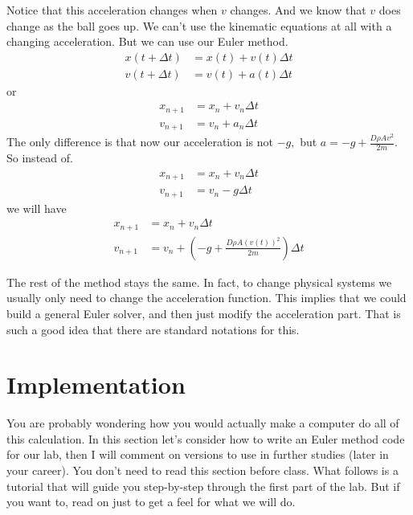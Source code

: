 \documentclass[twoside,11pt,ShortChapTitles]{BYUTextbook}
\begin{document}
Notice that this acceleration changes when $v$ changes. And we know that $v$
does change as the ball goes up. We can't use the kinematic equations at all
with a changing acceleration. But we can use our Euler method. \begin{align*}
x(t+\Delta t)  & =x(t)+v(t)\Delta t\\
v(t+\Delta t)  & =v(t)+a\left(  t\right)  \Delta t
\end{align*}
or \begin{align*}
x_{n+1}  & =x_{n}+v_{n}\Delta t\\
v_{n+1}  & =v_{n}+a_{n}\Delta t
\end{align*}
The only difference is that now our acceleration is not $-g,$ but
$a=-g+\frac{D\rho Av^{2}}{2m}.$ So instead of.
\begin{align*}
x_{n+1}  & =x_{n}+v_{n}\Delta t\\
v_{n+1}  & =v_{n}-g\Delta t
\end{align*}
we will have \begin{align*}
x_{n+1}  & =x_{n}+v_{n}\Delta t\\
v_{n+1}  & =v_{n}+\left(  -g+\frac{D\rho A\left(  v(t)\right)  ^{2}} {2m}\right)  \Delta t
\end{align*}


The rest of the method stays the same. In fact, to change physical systems we
usually only need to change the acceleration function. This implies that we
could build a general Euler solver, and then just modify the acceleration
part. That is such a good idea that there are standard notations for this.


\section{Implementation}

You are probably wondering how you would actually make a computer do all of
this calculation. In this section let's consider how to write an Euler method
code for our lab, then I will comment on versions to use in further studies
(later in your career). You don't need to read this section before class. What
follows is a tutorial that will guide you step-by-step through the first part
of the lab. But if you want to, read on just to get a feel for what we will do.
\end{document}
